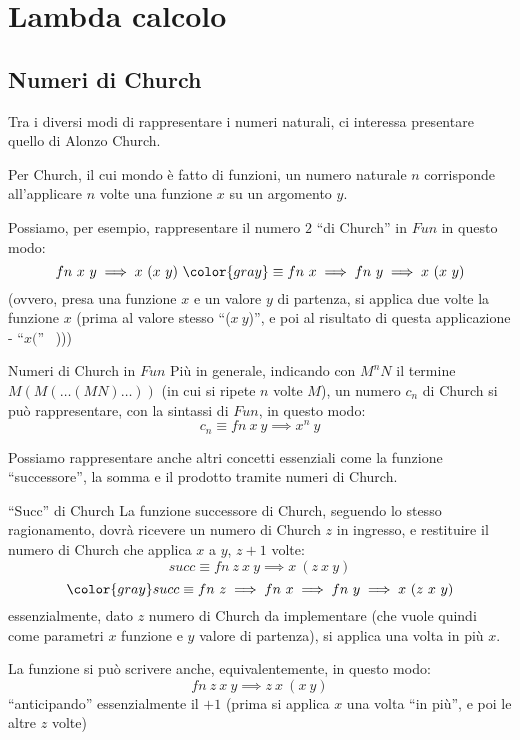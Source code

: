 \documentclass[a4paper,11pt]{report}
\begin{document}
\chapter{Lambda calcolo}

\section{Numeri di Church}
Tra i diversi modi di rappresentare i numeri naturali, ci interessa presentare quello di Alonzo Church.

Per Church, il cui mondo è fatto di funzioni, un numero naturale \( n \) corrisponde all'applicare \( n \) volte una funzione \( x \) su un argomento \( y \).
 
Possiamo, per esempio, rappresentare il numero \( 2 \) ``di Church'' in \( Fun \) in questo modo:
\[ fn \  x \ y \implies x \ (x \ y) \ {\color{gray} \equiv fn \ x \implies fn \ y \implies x \ (x \ y) }\]
    (ovvero, presa una funzione \( x \) e un valore \( y \) di partenza, si applica due volte la funzione \( x \) (prima al valore stesso ``(\( x \ y \))'', e poi al risultato di questa applicazione - ``\( x( \)'' \ )))

\begin{defbox}{Numeri di Church in \( Fun \)}{}
    Più in generale, indicando con \( M^n N \) il termine \( M(M(\dots(MN)\dots)) \) {\small\color{gray}(in cui si ripete \( n \) volte \( M \))}, un numero \(c_n\) di Church si può rappresentare, con la sintassi di \( Fun \), in questo modo:
    \[ c_n \equiv fn \ x \ y \implies x^n \ y \]
\end{defbox}

Possiamo rappresentare anche altri concetti essenziali come la funzione ``successore'', la somma e il prodotto tramite numeri di Church.

\begin{defbox}{``Succ'' di Church}{}
    La funzione successore di Church, seguendo lo stesso ragionamento, dovrà ricevere un numero di Church \( z \) in ingresso, e restituire il numero di Church che applica \( x \) a \( y \), \( z+1 \) volte:
    \[ succ \equiv fn \ z \ x \ y \implies x\ (z \ x \ y) \]
    \[\color{gray} succ \equiv fn \ z \implies fn \ x \implies fn \ y \implies x\ (z \ x \ y) \]
    essenzialmente, dato \( z \) numero di Church da implementare (che vuole quindi come parametri \( x \) funzione e \( y \) valore di partenza), si applica una volta in più \( x \).

    La funzione si può scrivere anche, equivalentemente, in questo modo:
    \[ fn \ z \ x \ y \implies z \ x \ (x \ y) \]
    ``anticipando'' essenzialmente il \( +1 \) (prima si applica \( x \) una volta ``in più'', e poi le altre \( z \) volte)
\end{defbox}
\end{document}
